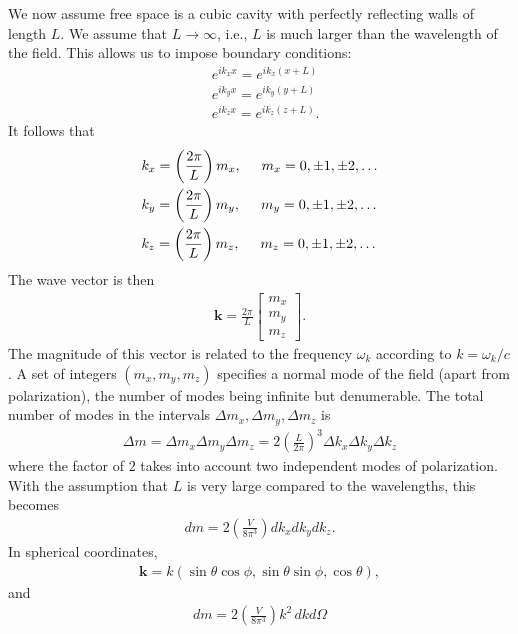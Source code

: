 \documentclass{book}
\theoremstyle{definition}
\newcommand{\f}[2]{\frac{#1}{#2}}
\newcommand{\lp}{\left(}
\newcommand{\rp}{\right)}
\begin{document}
We now assume free space is a cubic cavity with perfectly reflecting walls of length $L$. We assume that $L \to \infty$, i.e., $L$ is much larger than the wavelength of the field. This allows us to impose boundary conditions:
\begin{align}
&e^{ik_x x} = e^{ik_x(x+L)}\\
&e^{ik_y x} = e^{ik_y(y+L)}\\
&e^{ik_z x} = e^{ik_z(z+L)}.
\end{align}
It follows that
\begin{align}
&k_x = \lp \f{2\pi}{L} \rp m_x, \hspace{0.5cm} m_x = 0, \pm 1, \pm 2, \dots\\
&k_y = \lp \f{2\pi}{L} \rp m_y, \hspace{0.5cm} m_y = 0, \pm 1, \pm 2, \dots\\
&k_z = \lp \f{2\pi}{L} \rp m_z, \hspace{0.5cm} m_z = 0, \pm 1, \pm 2, \dots
\end{align}
The wave vector is then
\begin{align}
\mathbf{k} = \f{2\pi }{L}\begin{bmatrix}
m_x\\m_y\\m_z
\end{bmatrix}.
\end{align}
The magnitude of this vector is related to the frequency $\omega_k$ according to $k = \omega_k / c$. A set of integers $(m_x , m_y , m_z)$ specifies a normal mode of the field (apart from polarization), the number of modes being infinite but denumerable. The total number of modes in the intervals $\Delta m_x, \Delta m_y, \Delta m_z$ is
\begin{align}
\Delta m = \Delta m_x \Delta m_y \Delta m_z = 2\lp \f{L}{2\pi} \rp^3 \Delta k_x \Delta k_y \Delta k_z
\end{align}
where the factor of $2$ takes into account two independent modes of polarization. With the assumption that $L$ is very large compared to the wavelengths, this becomes
\begin{align}
dm = 2\lp \f{V}{8\pi^3} \rp d k_x d k_y d k_z.
\end{align}
In spherical coordinates, 
\begin{align}
\mathbf{k} = k(\sin\theta\cos\phi, \sin\theta\sin\phi, \cos\theta),
\end{align}
and 
\begin{align}
dm = 2\lp \f{V}{8\pi^3} \rp k^2 \, dk d\Omega
\end{align}
\end{document}
